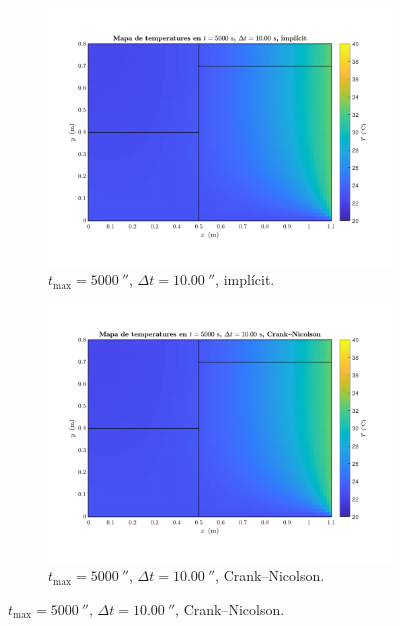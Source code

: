 \begin{figure}[ht]
	\centering
	\begin{subfigure}{.5\textwidth}
		\centering
		\includegraphics[width=.95\linewidth]{imagenes/04_analisi_influencia_dades_numeriques/esquema/esquema_1.pdf}
		\vspace{-15pt}
		\caption{$t_\text{max} = 5000 \ \second$, $\Delta t = 10.00 \ \second$, implícit.}
		\label{fig:esquema_1}
	\end{subfigure}%
	\begin{subfigure}{.5\textwidth}
		\centering
		\includegraphics[width=.95\linewidth]{imagenes/04_analisi_influencia_dades_numeriques/esquema/esquema_2.pdf}
		\vspace{-15pt}
		\caption{$t_\text{max} = 5000 \ \second$, $\Delta t = 10.00 \ \second$, Crank--Nicolson.}

\end{subfigure}
\end{figure}
